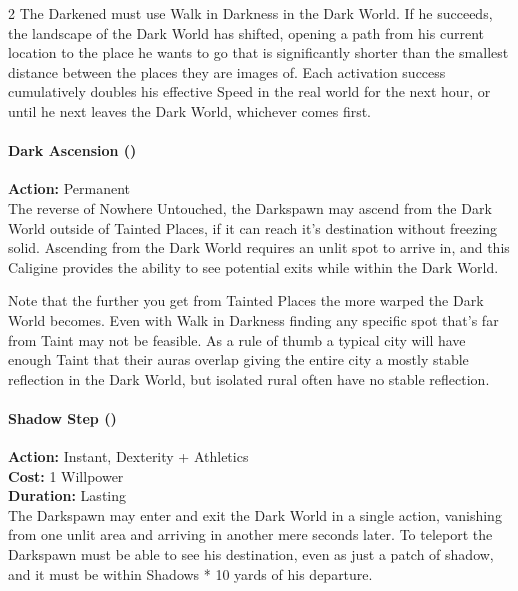\begin{multicols}{2}
The Darkened must use Walk in Darkness in the Dark World. If he succeeds, the landscape of the Dark World has shifted, opening a path from his current location to the place he wants to go that is significantly shorter than the smallest distance between the places they are images of. Each activation success cumulatively doubles his effective Speed in the real world for the next hour, or until he next leaves the Dark World, whichever comes first. \\

\paragraph*{Dark Ascension (\textbullet\textbullet\textbullet\textbullet)} 

\noindent \textbf{Action:} Permanent\\

The reverse of Nowhere Untouched, the Darkspawn may ascend from the Dark World outside of Tainted Places, if it can reach it's destination without freezing solid. Ascending from the Dark World requires an unlit spot to arrive in, and this Caligine provides the ability to see potential exits while within the Dark World. 

Note that the further you get from Tainted Places the more warped the Dark World becomes. Even with Walk in Darkness finding any specific spot that's far from Taint may not be feasible. As a rule of thumb a typical city will have enough Taint that their auras overlap giving the entire city a mostly stable reflection in the Dark World, but isolated rural often have no stable reflection.\\

\paragraph*{Shadow Step (\textbullet\textbullet\textbullet\textbullet\textbullet)} 

\noindent \textbf{Action:} Instant, Dexterity + Athletics\\

\noindent \textbf{Cost:} 1 Willpower\\

\noindent \textbf{Duration:} Lasting \\

\noindent The Darkspawn may enter and exit the Dark World in a single action, vanishing from one unlit area and arriving in another mere seconds later. To teleport the Darkspawn must be able to see his destination, even as just a patch of shadow, and it must be within Shadows * 10 yards of his departure.


\end{multicols}
